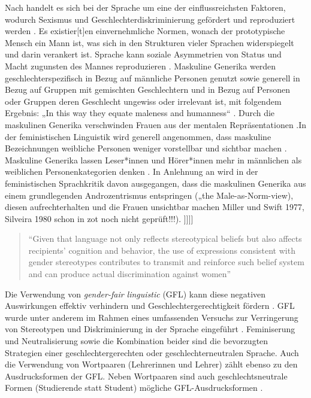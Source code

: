 \documentclass[12pt, 
    twoside=false, 
    bibliography=totoc, 
    numbers=endperiod, 
    headings=normal, 
    toc=chapterentrydotfill
    ]{scrbook}
\begin{document}
Nach \textcite{menegatti_2017} handelt es sich bei der Sprache um eine der einflussreichsten Faktoren, wodurch Sexismus und Geschlechterdiskriminierung gefördert und reproduziert werden \parencite*[1]{menegatti_2017}. Es existier[t]en einvernehmliche Normen, wonach der prototypische Mensch ein Mann ist, was sich in den Strukturen vieler Sprachen widerspiegelt und darin verankert ist. Sprache kann soziale Asymmetrien von Status und Macht zugunsten des Mannes reproduzieren \parencite{menegatti_2017}.
Maskuline Generika werden geschlechterspezifisch in Bezug auf männliche Personen genutzt sowie generell in Bezug auf Gruppen mit gemischten Geschlechtern und in Bezug auf Personen oder Gruppen deren Geschlecht ungewiss oder irrelevant ist, mit folgendem Ergebnis: „In this way they equate maleness and humanness“ \parencite[169]{stahlberg_2007}. Durch die maskulinen Generika verschwinden Frauen aus der mentalen Repräsentationen \parencites{vaughan_2018}{stahlberg_2001}.In der feministischen Linguistik wird generell angenommen, dass maskuline Bezeichnungen weibliche Personen weniger vorstellbar und sichtbar machen \parencite[131]{stahlberg_2001}. Maskuline Generika lassen Leser*innen und Hörer*innen mehr in männlichen als weiblichen Personenkategorien denken \parencites[2]{sczesny_2016}{stahlberg_2007}. In Anlehnung an \textcite{stahlberg_2007} wird in der feministischen Sprachkritik davon ausgegangen, dass die maskulinen Generika aus einem grundlegenden Androzentrismus entspringen („the Male-as-Norm-view), diesen aufrechterhalten und die Frauen unsichtbar machen \parencites[170]{stahlberg_2007}{miller_1976}{silveira_1980} Miller und Swift 1977, Silveira 1980 schon in zot noch nicht geprüft!!!).
]]]]

\begin{quote}
    \enquote{Given that language not only reflects stereotypical beliefs but also affects recipients’ cognition and behavior, the use of expressions consistent with gender stereotypes contributes to transmit and reinforce such belief system and can produce actual discrimination against women} \parencite[2]{menegatti_2017}
\end{quote}

Die Verwendung von \emph{gender-fair linguistic} (GFL) kann diese negativen Auswirkungen effektiv verhindern und Geschlechtergerechtigkeit fördern \parencite[1]{menegatti_2017}. GFL wurde unter anderem im Rahmen eines umfassenden Versuchs zur Verringerung von Stereotypen und Diskriminierung in der Sprache eingeführt \parencite[2]{sczesny_2016}. Feminiserung und Neutralisierung sowie die Kombination beider sind die bevorzugten Strategien einer geschlechtergerechten oder geschlechterneutralen Sprache. Auch die Verwendung von Wortpaaren (Lehrerinnen und Lehrer) zählt ebenso zu den Ausdrucksformen der GFL. Neben Wortpaaren sind auch geschlechtsneutrale Formen (Studierende statt Student) mögliche GFL-Ausdrucksformen \parencite[2]{sczesny_2016}.
\end{document}
